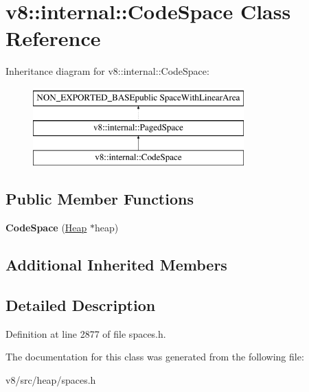 \hypertarget{classv8_1_1internal_1_1CodeSpace}{}\section{v8\+:\+:internal\+:\+:Code\+Space Class Reference}
\label{classv8_1_1internal_1_1CodeSpace}
Inheritance diagram for v8\+:\+:internal\+:\+:Code\+Space\+:\begin{figure}[H]
\begin{center}
\leavevmode
\includegraphics[height=3.000000cm]{classv8_1_1internal_1_1CodeSpace}
\end{center}
\end{figure}
\subsection*{Public Member Functions}
\begin{DoxyCompactItemize}
\item 
\mbox{\label{classv8_1_1internal_1_1CodeSpace_a8acce6cc1d71b37b18d50e9694ec6ef5}} 
{\bfseries Code\+Space} (\mbox{\hyperlink{classv8_1_1internal_1_1Heap}{Heap}} $\ast$heap)
\end{DoxyCompactItemize}
\subsection*{Additional Inherited Members}


\subsection{Detailed Description}


Definition at line 2877 of file spaces.\+h.



The documentation for this class was generated from the following file\+:\begin{DoxyCompactItemize}
\item 
v8/src/heap/spaces.\+h\end{DoxyCompactItemize}
